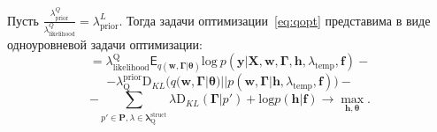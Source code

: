 \begin{theorem}
Пусть $\frac{{\lambda_{\text{prior}}^Q}}{{\lambda_{\text{likelihood}}^Q}} = {\lambda_{\text{prior}}^L}$. 
Тогда задачи оптимизации~\eqref{eq:qopt} представима в виде одноуровневой задачи оптимизации:
\[
= {\lambda_\text{likelihood}^\text{Q}\mathsf{E}_{{q(\mathbf{w}, \boldsymbol{\Gamma}| \boldsymbol{\theta})}} \text{log}~{p(\mathbf{y} | \mathbf{X}, \mathbf{w},\boldsymbol{\Gamma}, \mathbf{h}, \lambda_\text{temp}, \mathbf{f})}}
 -\]
\vspace{-0.3cm}
\[- {\lambda^\text{prior}_\text{Q}\text{D}_{KL}\bigl( q(\mathbf{w}, \boldsymbol{\Gamma}|\boldsymbol{\theta}) || p(\mathbf{w}, \boldsymbol{\Gamma} |\mathbf{h}, \lambda_{\text{temp}},\mathbf{f}) \bigr)}  -\]
\vspace{-0.3cm}
\[
-{\sum_{p' \in \mathbf{P}, \lambda \in \boldsymbol{\lambda}^\text{struct}_\text{Q}} \lambda\text{D}_{KL}(\boldsymbol{\Gamma} | p')+\text{log}p(\mathbf{h}|\mathbf{f})} \to \max_{\mathbf{h}, \boldsymbol{\theta}}. 
\]  
\end{theorem}
